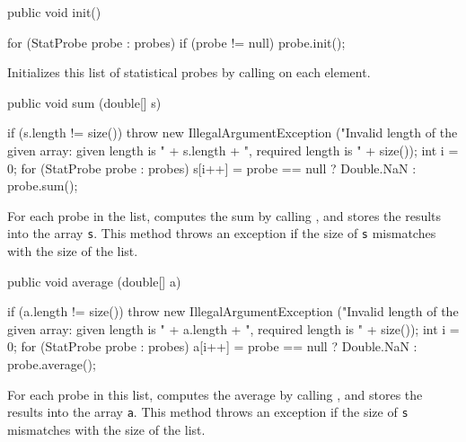 \begin{code}

   public void init()\begin{hide} {
      for (StatProbe probe : probes) {
         if (probe != null)
            probe.init();
      }
   }\end{hide}
\end{code}
\begin{tabb}   Initializes this list of statistical probes by calling
  on each element.
\end{tabb}
\begin{code}

   public void sum (double[] s)\begin{hide} {
      if (s.length != size())
         throw new IllegalArgumentException
            ("Invalid length of the given array: given length is " + s.length +
             ", required length is " + size());
      int i = 0;
      for (StatProbe probe : probes)
         s[i++] = probe == null ? Double.NaN : probe.sum();
   }\end{hide}
\end{code}
\begin{tabb}   For each probe in the list, computes
 the sum by calling , and stores
 the results into the array \texttt{s}. This method throws an exception if the size of \texttt{s}
 mismatches with the size of the list.
\end{tabb}
\begin{htmlonly}
\end{htmlonly}
\begin{code}

   public void average (double[] a)\begin{hide} {
      if (a.length != size())
         throw new IllegalArgumentException
            ("Invalid length of the given array: given length is " + a.length +
             ", required length is " + size());
      int i = 0;
      for (StatProbe probe : probes)
         a[i++] = probe == null ? Double.NaN : probe.average();
   }\end{hide}
\end{code}
\begin{tabb}   For each probe in this list, computes
 the average by calling , and stores
 the results into the array \texttt{a}. This method throws an exception if the size of \texttt{s}
 mismatches with the size of the list.
\end{tabb}
